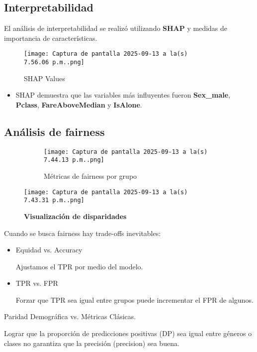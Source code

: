 \documentclass[sjournal]{IEEEtran}
\begin{document}
\subsection*{Interpretabilidad}
El análisis de interpretabilidad se realizó utilizando \textbf{SHAP} y medidas de importancia de características.
\begin{figure}[H]
    \centering
    \texttt{[image: Captura de pantalla 2025-09-13 a la(s) 7.56.06 p.m..png]}
    \caption{SHAP Values}
    \label{fig:placeholder}
\end{figure}
\begin{itemize}
    \item SHAP demuestra que las variables más influyentes fueron \textbf{Sex\_male}, \textbf{Pclass}, \textbf{FareAboveMedian} y \textbf{IsAlone}.


\end{itemize}

\subsection*{Análisis de fairness}

\begin{figure}[H]
\begin{figure}
        \centering
        \texttt{[image: Captura de pantalla 2025-09-13 a la(s) 7.44.13 p.m..png]}
        \caption{Métricas de fairness por grupo}
        \label{fig:placeholder}
    \end{figure}
        \centering
    \texttt{[image: Captura de pantalla 2025-09-13 a la(s) 7.43.31 p.m..png]}
    \caption{ \textbf{Visualización de disparidades}}
    \label{fig:placeholder}
\end{figure}
Cuando se busca fairness hay trade-offs inevitables:

\begin{itemize}
    \item Equidad vs. Accuracy

Ajustamos el TPR por medio del modelo.

    \item TPR vs. FPR

 Forzar que TPR sea igual entre grupos puede incrementar el FPR de algunos.

\end{itemize}
Paridad Demográfica vs. Métricas Clásicas.

Lograr que la proporción de predicciones positivas (DP) sea igual entre géneros o clases no garantiza que la precisión (precision) sea buena.
\end{document}
